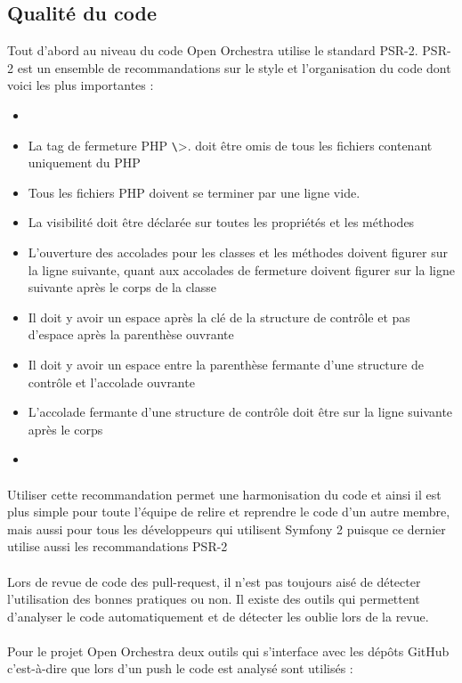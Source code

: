 \subsection{Qualité du code}
Tout d'abord au niveau du code Open Orchestra utilise le standard PSR-2. PSR-2 est un ensemble de recommandations sur le style et l'organisation du code dont voici les plus importantes : 
\begin{itemize}
\item[]
\item La tag de fermeture PHP \verb?\?>. doit être omis de tous les fichiers contenant uniquement du PHP
\item Tous les fichiers PHP doivent se terminer par une ligne vide.
\item La visibilité doit être déclarée sur toutes les propriétés et les méthodes
\item L'ouverture des accolades pour les classes et les méthodes doivent figurer sur la ligne suivante, quant aux accolades de fermeture doivent figurer sur la ligne suivante après le corps de la classe
\item Il doit y avoir un espace après la clé de la structure de contrôle et pas d'espace après la parenthèse ouvrante
\item Il doit y avoir un espace entre la parenthèse fermante d'une structure de contrôle et l'accolade
 ouvrante
 \item L'accolade fermante d'une structure de contrôle doit être sur la ligne suivante après le corps
 \item[]
\end{itemize}
\paragraph{}
Utiliser cette recommandation permet une harmonisation du code et ainsi il est plus simple pour toute l'équipe de relire et reprendre le code d'un autre membre, mais aussi pour tous les développeurs qui utilisent Symfony 2 puisque ce dernier utilise aussi les recommandations PSR-2
\paragraph{}
Lors de revue de code des pull-request, il n'est pas toujours aisé de détecter l'utilisation des bonnes pratiques ou non. Il existe des outils qui permettent d'analyser le code automatiquement et de détecter les oublie lors de la revue.
\paragraph{}
Pour le projet Open Orchestra deux outils qui s'interface avec les dépôts GitHub c'est-à-dire que lors d'un push le code est analysé sont utilisés : 
